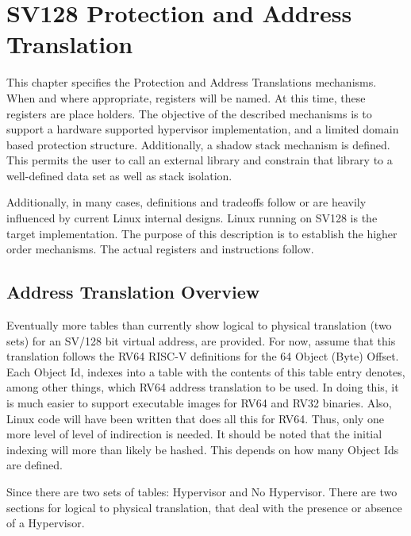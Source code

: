 \documentclass{article}
\begin{document}
\pagebreak





\section{SV128 Protection and Address Translation} 

This chapter specifies  the Protection and Address Translations mechanisms. When and where appropriate,  registers will be named.  At this time,  these registers are place holders. The objective of the described mechanisms is to support a hardware supported hypervisor implementation, and a limited domain based protection structure.  Additionally, a shadow stack mechanism is defined.  This permits the user to call an external library and constrain that library to  a well-defined data set as well as stack isolation.  

Additionally, in many cases,  definitions and tradeoffs follow or are heavily influenced by current Linux internal designs.   Linux running on SV128 is the target implementation. The purpose of this description is to establish the higher order mechanisms.  The actual registers and instructions follow. 

\subsection {Address Translation Overview}

Eventually more tables than currently show logical to physical translation (two sets) for an SV/128 bit virtual address, are provided.    For now, assume that this translation follows the RV64 RISC-V definitions for the 64 Object  (Byte) Offset.  Each Object Id,  indexes into a table   with the contents of this table entry denotes, among other things,  which RV64 address translation to be used.   In doing this,   it is much easier to support executable images for RV64 and RV32 binaries.  Also, Linux code will have been written that does all this for RV64.  Thus, only one more level of level of indirection is needed. It should be noted that the initial  indexing will more than likely be hashed.  This depends on how many Object Ids  are defined.

Since there are two sets of tables:  Hypervisor and No  Hypervisor.   There are two sections for logical to physical translation,  that deal with the presence or absence of a Hypervisor.
\end{document}
